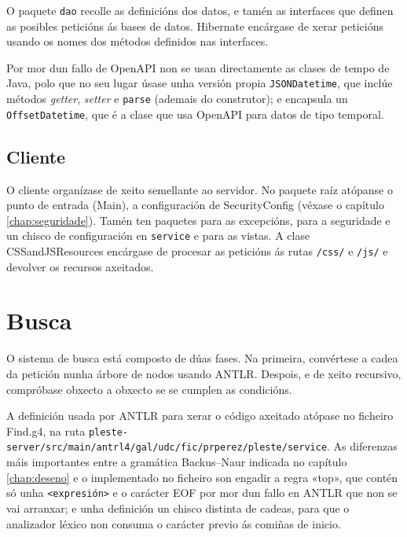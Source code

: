 O paquete \texttt{dao} recolle as definicións dos datos, e tamén as interfaces que definen as posibles peticións ás bases de datos. Hibernate encárgase de xerar peticións usando os nomes dos métodos definidos nas interfaces.\cite{jpaquery}

Por mor dun fallo de OpenAPI\cite{jsondate} non se usan directamente as clases de tempo de Java, polo que no seu lugar úsase unha versión propia \texttt{JSONDatetime}, que inclúe métodos \textit{getter}, \textit{setter} e \texttt{parse} (ademais do construtor); e encapsula un \texttt{OffsetDatetime}, que é a clase que usa OpenAPI para datos de tipo temporal.

\subsection{Cliente}

O cliente organízase de xeito semellante ao servidor. No paquete raíz atópanse o punto de entrada (Main), a configuración de SecurityConfig (véxase o capítulo \ref{chap:seguridade}). Tamén ten paquetes para as excepcións, para a seguridade e un chisco de configuración en \texttt{service} e para as vistas. A clase CSSandJSResources encárgase de procesar as peticións ás rutas \texttt{/css/} e \texttt{/js/} e devolver os recursos axeitados.

\section{Busca}
\label{sec:busca}

O sistema de busca está composto de dúas fases. Na primeira, convértese a cadea da petición nunha árbore de nodos usando ANTLR. Despois, e de xeito recursivo, compróbase obxecto a obxecto se se cumplen as condicións.

A definición usada por ANTLR para xerar o código axeitado atópase no ficheiro Find.g4, na ruta \texttt{pleste-server\allowbreak{}/src\allowbreak{}/main\allowbreak{}/antrl4\allowbreak{}/gal\allowbreak{}/udc\allowbreak{}/fic\allowbreak{}/prperez\allowbreak{}/pleste\allowbreak{}/service}. As diferenzas máis importantes entre a gramática Backus–Naur indicada no capítulo \ref{chap:deseno} e o implementado no ficheiro son engadir a regra «top», que contén só unha \texttt{<expresión>} e o carácter EOF por mor dun fallo en ANTLR que non se vai arranxar\cite{antlr118}; e unha definición un chisco distinta de cadeas, para que o analizador léxico non consuma o carácter previo ás comiñas de inicio.

